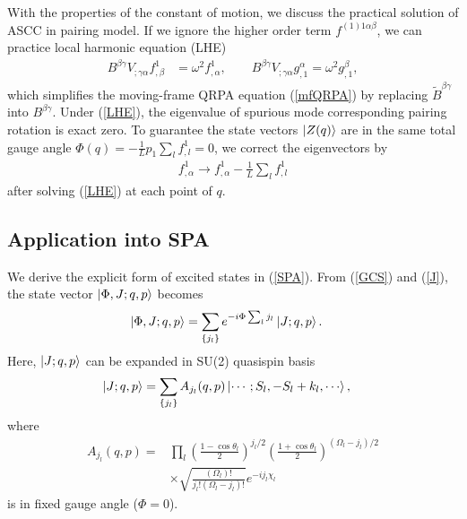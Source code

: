 \documentclass[%
superscriptaddress,
showpacs,
nofootinbib,
amsmath,amssymb,
aps,
prc,
twocolumn,
floatfix ]%
{revtex4-1}
\begin{document}
With the properties of the constant of motion, we discuss the practical solution of ASCC in pairing model. If we ignore the higher order term $f^{(1)1\alpha\beta}$, we can practice local harmonic equation (LHE)
\begin{align}
  B^{\beta\gamma}V_{;\gamma\alpha}f^1_{,\beta}  &= \omega^2 f^1_{,\alpha},\hspace{2em} 
  B^{\beta\gamma}V_{;\gamma\alpha}g^{\alpha}_{,1} = \omega^2 g^{\beta}_{,1},
  \label{LHE}
\end{align}
which simplifies the moving-frame QRPA equation (\ref{mfQRPA}) by replacing $\tilde{B}^{\beta\gamma}$ into $B^{\beta\gamma}$. Under (\ref{LHE}), the eigenvalue of spurious mode corresponding pairing rotation is exact zero. To guarantee the state vectors $\ket{Z(q)}$ are in the same total gauge angle $\Phi(q)=-\frac{1}{L} p_1\sum_l f^1_{,l}=0$, we correct the eigenvectors by
\begin{align}
  f^1_{,\alpha} \to f^1_{,\alpha} - \frac{1}{L}\sum_l f^1_{,l} 
  \label{f}
\end{align}
after solving (\ref{LHE}) at each point of $q$.

\subsection{Application into SPA}
We derive the explicit form of excited states in (\ref{SPA}). From (\ref{GCS}) and (\ref{J}), the state vector $\ket{\Phi,J;q,p}$ becomes
\begin{align}
  \ket{\Phi,J;q,p} &= \sum_{\{j_l\}} e^{-i\Phi \sum_l j_l} \ket{J;q,p} .
\end{align}
Here, $\ket{J;q,p}$ can be expanded in SU(2) quasispin basis
\begin{align}
  \ket{J;q,p} &= \sum_{\{j_l\}} A_{j_l}(q,p) \ket{\cdots;S_l,-S_l+k_l,\cdots}, 
\end{align}
where 
\begin{align}
  A_{j_l}(q,p) =& \prod_l \left(\frac{1-\cos{\theta}_l}{2}\right)^{j_l/2}\left(\frac{1+\cos{\theta}_l}{2}\right)^{(\Omega_l-j_l)/2}
  \nonumber \\
  &\times\sqrt{\frac{(\Omega_l)!}{j_l!(\Omega_l-j_l)!}} e^{-ij_l\chi_l} 
\end{align}
is in fixed gauge angle ($\Phi=0$).
\end{document}
